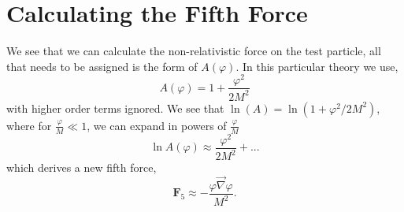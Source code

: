 \section{Calculating the Fifth Force}
We see that we can calculate the non-relativistic force on the test particle, all that needs to be assigned is the form of $A(\varphi)$. In this particular theory we use, 
\begin{equation}
    A(\varphi) = 1 + \frac{\varphi^2}{2M^2}
\end{equation}
with higher order terms ignored. We see that $\ln(A) = \ln(1 + \varphi^2/2M^2)$, where for $\frac{\varphi}{M}\ll 1$, we can expand in powers of $\frac{\varphi}{M}$
\begin{equation}
    \ln A(\varphi)\approx \frac{\varphi^2}{2M^2}+...
\end{equation}
which derives a new fifth force,
\begin{equation}
    \mathbf{F}_5 \approx - \frac{\varphi\vec{\nabla}\varphi}{M^2}.
\end{equation}



